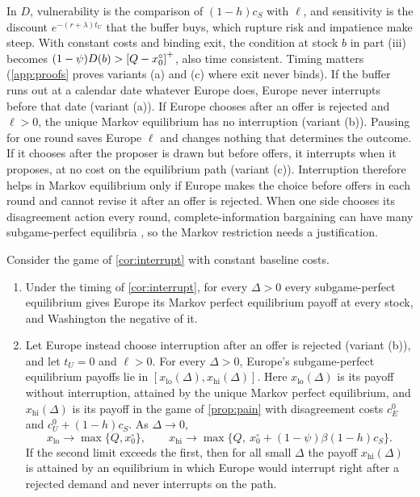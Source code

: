 In $D$, vulnerability is the comparison of $(1-h)c_S$ with $\ell$, and sensitivity is the discount $e^{-(r+\lambda)t_U}$ that the buffer buys, which rupture risk and impatience make steep. With constant costs and binding exit, the condition at stock $b$ in part (iii) becomes $(1-\psi)D(b)>\left[Q-x^\circ_0\right]^{+}$, also time consistent. Timing matters (\cref{app:proofs} proves variants (a) and (c) where exit never binds). If the buffer runs out at a calendar date whatever Europe does, Europe never interrupts before that date (variant (a)). If Europe chooses after an offer is rejected and $\ell>0$, the unique Markov equilibrium has no interruption (variant (b)). Pausing for one round saves Europe $\ell$ and changes nothing that determines the outcome. If it chooses after the proposer is drawn but before offers, it interrupts when it proposes, at no cost on the equilibrium path (variant (c)). Interruption therefore helps in Markov equilibrium only if Europe makes the choice before offers in each round and cannot revise it after an offer is rejected. When one side chooses its disagreement action every round, complete-information bargaining can have many subgame-perfect equilibria \citep{fernandez1991striking, haller1990letter, busch1995perfect}, so the Markov restriction needs a justification.

\begin{proposition}\label{prop:range}
Consider the game of \cref{cor:interrupt} with constant baseline costs.
\begin{enumerate}[label=(\roman*)]
\item Under the timing of \cref{cor:interrupt}, for every $\Delta>0$ every subgame-perfect equilibrium gives Europe its Markov perfect equilibrium payoff at every stock, and Washington the negative of it.
\item Let Europe instead choose interruption after an offer is rejected (variant (b)), and let $t_U=0$ and $\ell>0$. For every $\Delta>0$, Europe's subgame-perfect equilibrium payoffs lie in $[x_{\mathrm{lo}}(\Delta),x_{\mathrm{hi}}(\Delta)]$. Here $x_{\mathrm{lo}}(\Delta)$ is its payoff without interruption, attained by the unique Markov perfect equilibrium, and $x_{\mathrm{hi}}(\Delta)$ is its payoff in the game of \cref{prop:pain} with disagreement costs $c^0_E$ and $c^0_U+(1-h)c_S$. As $\Delta\to0$,
\[ x_{\mathrm{lo}}\to\max\{Q,x^\circ_0\},\qquad x_{\mathrm{hi}}\to\max\{Q,\ x^\circ_0+(1-\psi)\beta(1-h)c_S\}. \]
If the second limit exceeds the first, then for all small $\Delta$ the payoff $x_{\mathrm{hi}}(\Delta)$ is attained by an equilibrium in which Europe would interrupt right after a rejected demand and never interrupts on the path.
\end{enumerate}
\end{proposition}

